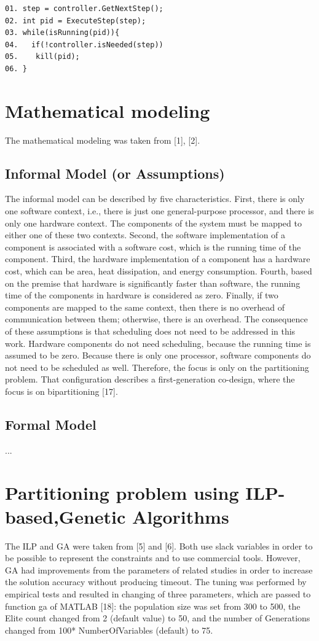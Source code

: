 \begin{lstlisting}
01. step = controller.GetNextStep();
02. int pid = ExecuteStep(step);
03. while(isRunning(pid)){
04.   if(!controller.isNeeded(step))
05.    kill(pid);
06. }     
\end{lstlisting}

\section{Mathematical modeling}
The mathematical modeling was taken from [1], [2].
\subsection{Informal Model (or Assumptions)}
The informal model can be described by five characteristics. First, there is only one software context, i.e., there is just one general-purpose processor, and there is only one hardware context. The components of the system must be mapped to either one of these two contexts. Second, the software implementation of a component is associated with a software cost, which is the running time of the component. Third, the hardware implementation of a component has a hardware cost, which can be area, heat dissipation, and energy consumption. Fourth, based on the premise that hardware is significantly faster than software, the running time of the components in hardware is considered as zero. Finally, if two components are mapped to the same context, then there is no overhead of communication between them; otherwise, there is an overhead. The consequence of these assumptions is that scheduling does not need to be addressed in this work. Hardware components do not need scheduling, because the running time is assumed to be zero. Because there is only one processor, software components do not need to be scheduled as well. Therefore, the focus is only on the partitioning problem. That configuration describes a first-generation co-design, where the focus is on bipartitioning [17].

\subsection{Formal Model}
...

\section{Partitioning problem using ILP-based,Genetic Algorithms}
\label{ILPGA}
The ILP and GA were taken from [5] and [6]. Both use slack variables in order to be possible to represent the constraints and to use commercial tools. However, GA had improvements from the parameters of related studies in order to increase the solution accuracy without producing timeout. The tuning was performed by empirical tests and resulted in changing of three parameters, which are passed to function ga of MATLAB [18]: the population size was set from 300 to 500, the Elite count changed from 2 (default value) to 50, and the number of Generations changed from 100* NumberOfVariables (default) to 75.

